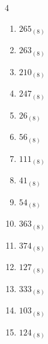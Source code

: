 \begin{multicols}{4}
\begin{enumerate}
        \phantom{$=207$}

  \item $265_{(8)}$

        \phantom{$=181$}

  \item $263_{(8)}$

        \phantom{$=179$}

  \item $210_{(8)}$

        \phantom{$=136$}

\columnbreak %

  \item $247_{(8)}$

        \phantom{$=167$}

  \item $26_{(8)}$

        \phantom{$=22$}

  \item $56_{(8)}$

        \phantom{$=46$}

  \item $111_{(8)}$

        \phantom{$=73$}

  \item $41_{(8)}$

        \phantom{$=33$}

  \item $54_{(8)}$

        \phantom{$=44$}

  \item $363_{(8)}$

        \phantom{$=243$}

  \item $374_{(8)}$

        \phantom{$=252$}

  \item $127_{(8)}$

        \phantom{$=87$}

  \item $333_{(8)}$

        \phantom{$=219$}

  \item $103_{(8)}$

        \phantom{$=67$}

  \item $124_{(8)}$

        \phantom{$=84$}


\end{enumerate}
\end{multicols}
